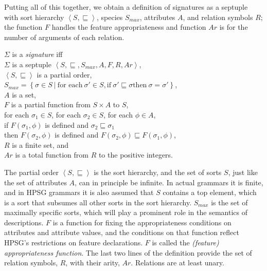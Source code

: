 \documentclass[output=paper
 	        ,biblatex
                ,babelshorthands
                ,newtxmath
                ,draftmode
                ,colorlinks, citecolor=brown
]{langscibook}
\begin{document}
{Putting all of this together, we obtain a definition of signatures
as a septuple with sort hierarchy $\left<S,\sqsubseteq\right>$, species
$S_{max}$, attributes $A$, and relation symbols $R$; the function $F$ handles
the feature appropriateness and function $Ar$ is for the number of arguments
of each relation.

\begin{mydef}\label{def-signature}
  $\Sigma$ is a \emph{signature} iff\\
  $\Sigma$ is a septuple $\left<S,\sqsubseteq,S_{max},A,F,R,Ar\right>$,\\
  $\left<S,\sqsubseteq\right>$ is a partial order,\\
  $S_{max} = \left\{\sigma\in S\ |\ \mbox{for each}\ \sigma' \in S, \mbox{if}\ \sigma'\sqsubseteq\sigma \mbox{then}\ \sigma=\sigma'\right\}$,\\
  $A$ is a set,\\
  $F$ is a partial function from $S\times A$ to $S$,\\
  for each $\sigma_1\in S$, for each $\sigma_2\in S$, for each $\phi\in A$,\\
  \hspace*{.5cm} if $F(\sigma_1,\phi)$ is defined and $\sigma_2\sqsubseteq\sigma_1$\\
  \hspace*{.5cm} then $F(\sigma_2,\phi)$ is defined and
             $F(\sigma_2,\phi)\sqsubseteq F(\sigma_1,\phi)$,\\
  $R$ is a finite set, and\\
  $Ar$ is a total function from $R$ to the positive integers.
\end{mydef}

The partial order $\left<S,\sqsubseteq\right>$ is the sort hierarchy,
and the set of sorts $S$, just like the set of attributes $A$, can in principle
be infinite. In actual grammars it is finite, and in HPSG grammars it is
also assumed that $S$ contains a top element, which is a sort that subsumes
all other sorts in the sort hierarchy. $S_{max}$ is the set of maximally
specific sorts, which will play a prominent role in the semantics of
descriptions. $F$ is a function for fixing the appropriateness conditions
on attributes and attribute values, and the conditions on that function
reflect HPSG's restrictions on feature declarations. $F$ is called the
\emph{(feature) appropriateness function}. The last two lines of
the definition provide the set of relation symbols, $R$, with their arity, $Ar$.
Relations are at least unary.

}
\end{document}
